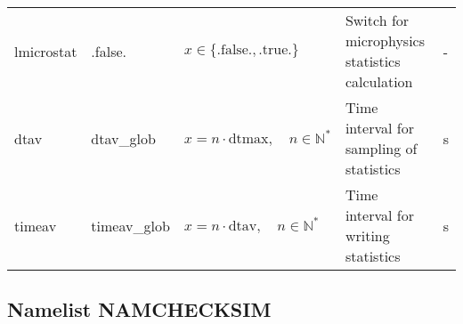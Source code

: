 \documentclass[twoside,11pt,fleqn,a4paper,english,openright]{report}
\begin{document}
\begin{center}
  \tablelasttail{
        &&&&\\\hline
  }
\begin{supertabular}{|l|p{2cm}|p{4cm}|p{6cm}|l|}
  lmicrostat	& .false.	& $x\in\{\text{.false.},\text{.true.}\}$	& Switch for microphysics statistics calculation	& -\\
  dtav		& dtav\_glob	& $x = n \cdot \text{dtmax}, \quad n \in \mathbb{N}^*$	& Time interval for sampling of statistics	& s\\
  timeav	& timeav\_glob	& $x = n \cdot \text{dtav}, \quad n \in \mathbb{N}^*$	& Time interval for writing statistics		& s\\
\end{supertabular}
\end{center}

\subsection{Namelist NAMCHECKSIM}\label{par:checksim}
\end{document}
